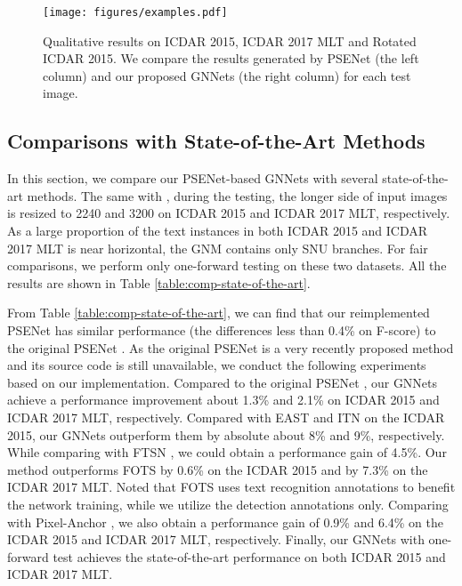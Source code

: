 \documentclass[10pt,twocolumn,letterpaper]{article}
\begin{document}
\begin{figure*}[t]
\centering
\texttt{[image: figures/examples.pdf]}
\caption{Qualitative results on ICDAR 2015, ICDAR 2017 MLT and Rotated ICDAR 2015. We compare the results generated by PSENet (the left column) and our proposed GNNets (the right column) for each test image.}
\vspace{-3mm}
\label{fig:examples}
\end{figure*}







\subsection{Comparisons with State-of-the-Art Methods}
\label{Sec:Comparisons}

In this section, we compare our PSENet-based GNNets with several state-of-the-art methods. The same with \cite{li2018shape}, during the testing, the longer side of input images is resized to 2240 and 3200 on ICDAR 2015 and ICDAR 2017 MLT, respectively. As a large proportion of the text instances in both ICDAR 2015 and ICDAR 2017 MLT is near horizontal, the GNM contains only SNU branches. For fair comparisons, we perform only one-forward testing on these two datasets. All the results are shown in Table \ref{table:comp-state-of-the-art}.

From Table \ref{table:comp-state-of-the-art}, we can find that our reimplemented PSENet has similar performance (the differences less than 0.4\% on F-score) to the original PSENet \cite{li2018shape}. As the original PSENet \cite{li2018shape} is a very recently proposed method and its source code is still unavailable, we conduct the following experiments based on our implementation. Compared to the original PSENet \cite{li2018shape}, our GNNets achieve a performance improvement about 1.3\% and 2.1\% on ICDAR 2015 and ICDAR 2017 MLT, respectively. Compared with EAST \cite{Zhou2017} and ITN \cite{wang2018geometry} on the ICDAR 2015, our GNNets outperform them by absolute about 8\% and 9\%, respectively. While comparing with FTSN \cite{dai2018fused}, we could obtain a performance gain of 4.5\%. Our method outperforms FOTS \cite{liu2018fots} by 0.6\% on the ICDAR 2015 and by 7.3\% on the ICDAR 2017 MLT. Noted that FOTS uses text recognition annotations to benefit the network training, while we  utilize the detection annotations only.
Comparing with Pixel-Anchor \cite{Li2018pixel}, we also obtain a performance gain of 0.9\% and 6.4\% on the ICDAR 2015 and ICDAR 2017 MLT, respectively.
Finally, our GNNets with one-forward test achieves the state-of-the-art performance on both ICDAR 2015 and ICDAR 2017 MLT.
\end{document}
